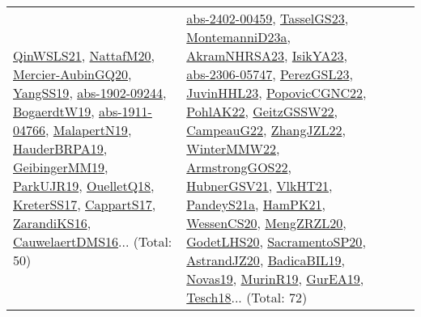 {\begin{longtable}{lp{3cm}>{\raggedright}p{6cm}>{\raggedright}p{6cm}p{8cm}}
\href{articles/QinWSLS21.pdf}{QinWSLS21}\cite{QinWSLS21}, \href{papers/NattafM20.pdf}{NattafM20}\cite{NattafM20}, \href{papers/Mercier-AubinGQ20.pdf}{Mercier-AubinGQ20}\cite{Mercier-AubinGQ20}, \href{papers/YangSS19.pdf}{YangSS19}\cite{YangSS19}, \href{articles/abs-1902-09244.pdf}{abs-1902-09244}\cite{abs-1902-09244}, \href{papers/BogaerdtW19.pdf}{BogaerdtW19}\cite{BogaerdtW19}, \href{articles/abs-1911-04766.pdf}{abs-1911-04766}\cite{abs-1911-04766}, \href{papers/MalapertN19.pdf}{MalapertN19}\cite{MalapertN19}, \href{articles/HauderBRPA19.pdf}{HauderBRPA19}\cite{HauderBRPA19}, \href{papers/GeibingerMM19.pdf}{GeibingerMM19}\cite{GeibingerMM19}, \href{papers/ParkUJR19.pdf}{ParkUJR19}\cite{ParkUJR19}, \href{papers/OuelletQ18.pdf}{OuelletQ18}\cite{OuelletQ18}, \href{articles/KreterSS17.pdf}{KreterSS17}\cite{KreterSS17}, \href{papers/CappartS17.pdf}{CappartS17}\cite{CappartS17}, \href{articles/ZarandiKS16.pdf}{ZarandiKS16}\cite{ZarandiKS16}, \href{papers/CauwelaertDMS16.pdf}{CauwelaertDMS16}\cite{CauwelaertDMS16}... (Total: 50) & \href{articles/abs-2402-00459.pdf}{abs-2402-00459}\cite{abs-2402-00459}, \href{papers/TasselGS23.pdf}{TasselGS23}\cite{TasselGS23}, \href{articles/MontemanniD23a.pdf}{MontemanniD23a}\cite{MontemanniD23a}, \href{articles/AkramNHRSA23.pdf}{AkramNHRSA23}\cite{AkramNHRSA23}, \href{articles/IsikYA23.pdf}{IsikYA23}\cite{IsikYA23}, \href{articles/abs-2306-05747.pdf}{abs-2306-05747}\cite{abs-2306-05747}, \href{papers/PerezGSL23.pdf}{PerezGSL23}\cite{PerezGSL23}, \href{papers/JuvinHHL23.pdf}{JuvinHHL23}\cite{JuvinHHL23}, \href{papers/PopovicCGNC22.pdf}{PopovicCGNC22}\cite{PopovicCGNC22}, \href{articles/PohlAK22.pdf}{PohlAK22}\cite{PohlAK22}, \href{papers/GeitzGSSW22.pdf}{GeitzGSSW22}\cite{GeitzGSSW22}, \href{articles/CampeauG22.pdf}{CampeauG22}\cite{CampeauG22}, \href{papers/ZhangJZL22.pdf}{ZhangJZL22}\cite{ZhangJZL22}, \href{papers/WinterMMW22.pdf}{WinterMMW22}\cite{WinterMMW22}, \href{papers/ArmstrongGOS22.pdf}{ArmstrongGOS22}\cite{ArmstrongGOS22}, \href{articles/HubnerGSV21.pdf}{HubnerGSV21}\cite{HubnerGSV21}, \href{articles/VlkHT21.pdf}{VlkHT21}\cite{VlkHT21}, \href{articles/PandeyS21a.pdf}{PandeyS21a}\cite{PandeyS21a}, \href{articles/HamPK21.pdf}{HamPK21}\cite{HamPK21}, \href{papers/WessenCS20.pdf}{WessenCS20}\cite{WessenCS20}, \href{articles/MengZRZL20.pdf}{MengZRZL20}\cite{MengZRZL20}, \href{papers/GodetLHS20.pdf}{GodetLHS20}\cite{GodetLHS20}, \href{articles/SacramentoSP20.pdf}{SacramentoSP20}\cite{SacramentoSP20}, \href{articles/AstrandJZ20.pdf}{AstrandJZ20}\cite{AstrandJZ20}, \href{papers/BadicaBIL19.pdf}{BadicaBIL19}\cite{BadicaBIL19}, \href{articles/Novas19.pdf}{Novas19}\cite{Novas19}, \href{papers/MurinR19.pdf}{MurinR19}\cite{MurinR19}, \href{articles/GurEA19.pdf}{GurEA19}\cite{GurEA19}, \href{papers/Tesch18.pdf}{Tesch18}\cite{Tesch18}... (Total: 72)\\

\end{longtable}}
